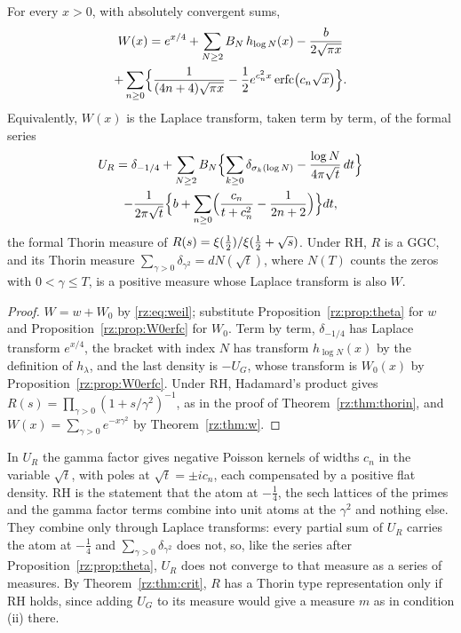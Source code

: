 \begin{theorem}\label{rz:thm:RLVJ}
For every $x>0$, with absolutely convergent sums,
\begin{multline*}
W(x)=e^{x/4}+\sum_{N\ge2}B_N\,h_{\log N}(x)-\frac{b}{2\sqrt{\pi x}}\\
+\sum_{n\ge0}\Bigl\{\frac{1}{(4n+4)\sqrt{\pi x}}-\frac12e^{c_n^2x}\operatorname{erfc}\bigl(c_n\sqrt x\bigr)\Bigr\}.
\end{multline*}
Equivalently, $W(x)$ is the Laplace transform, taken term by term, of the formal series
\begin{multline*}
U_R=\delta_{-1/4}+\sum_{N\ge2}B_N\Bigl\{\sum_{k\ge0}\delta_{\sigma_k(\log N)}-\frac{\log N}{4\pi\sqrt t}\,dt\Bigr\}\\
-\frac{1}{2\pi\sqrt t}\Bigl\{b+\sum_{n\ge0}\Bigl(\frac{c_n}{t+c_n^2}-\frac1{2n+2}\Bigr)\Bigr\}dt ,
\end{multline*}
the formal Thorin measure of $R(s)=\xi(\frac12)/\xi(\frac12+\sqrt{s})$. Under RH, $R$ is a GGC, and its Thorin measure $\sum_{\gamma>0}\delta_{\gamma^2}=dN(\sqrt t)$, where $N(T)$ counts the zeros with $0<\gamma\le T$, is a positive measure whose Laplace transform is also $W$.
\end{theorem}

\begin{proof}
$W=w+W_0$ by \eqref{rz:eq:weil}; substitute Proposition~\ref{rz:prop:theta} for $w$ and Proposition~\ref{rz:prop:W0erfc} for $W_0$. Term by term, $\delta_{-1/4}$ has Laplace transform $e^{x/4}$, the bracket with index $N$ has transform $h_{\log N}(x)$ by the definition of $h_\lambda$, and the last density is $-U_G$, whose transform is $W_0(x)$ by Proposition~\ref{rz:prop:W0erfc}. Under RH, Hadamard's product gives $R(s)=\prod_{\gamma>0}(1+s/\gamma^2)^{-1}$, as in the proof of Theorem~\ref{rz:thm:thorin}, and $W(x)=\sum_{\gamma>0}e^{-x\gamma^2}$ by Theorem~\ref{rz:thm:w}.
\end{proof}

In $U_R$ the gamma factor gives negative Poisson kernels of widths $c_n$ in the variable $\sqrt t$, with poles at $\sqrt t=\pm ic_n$, each compensated by a positive flat density. RH is the statement that the atom at $-\frac14$, the sech lattices of the primes and the gamma factor terms combine into unit atoms at the $\gamma^2$ and nothing else. They combine only through Laplace transforms: every partial sum of $U_R$ carries the atom at $-\frac14$ and $\sum_{\gamma>0}\delta_{\gamma^2}$ does not, so, like the series after Proposition~\ref{rz:prop:theta}, $U_R$ does not converge to that measure as a series of measures. By Theorem~\ref{rz:thm:crit}, $R$ has a Thorin type representation only if RH holds, since adding $U_G$ to its measure would give a measure $m$ as in condition (ii) there.

